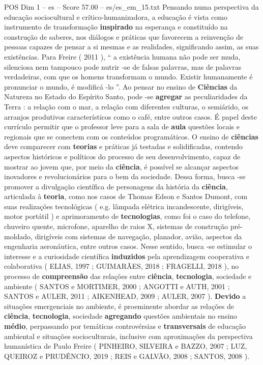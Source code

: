 \begin{textsample}{POS Dim 1 – es – Score 57.00 – es/es\_em\_15.txt}
Pensando numa perspectiva da educação sociocultural e crítico-humanizadora, a educação é vista como instrumento de transformação \textbf{inspirado} na esperança e constituído na construção de saberes, nos diálogos e práticas que favorecem a reinvenção de pessoas capazes de pensar a si mesmas e as realidades, significando assim, as suas existências.
Para Freire ( 2011 ), “ a existência humana não pode ser muda, silenciosa nem tampouco pode nutrir -se de falsas palavras, mas de palavras verdadeiras, com que os homens transformam o mundo.
Existir humanamente é pronunciar o mundo, é modificá -lo ”.
Ao pensar no ensino de \textbf{Ciências} da Natureza no Estado do Espírito Santo, pode -se \textbf{agregar} as peculiaridades da Terra : a relação com o mar, a relação com diferentes culturas, o semiárido, os arranjos produtivos característicos como o café, entre outros casos.
É papel deste currículo permitir que o professor leve para a sala de \textbf{aula} questões locais e regionais que se conectem com os conteúdos programáticos.
O ensino de \textbf{ciências} deve comparecer com \textbf{teorias} e práticas já testadas e solidificadas, contendo aspectos históricos e políticos do processo de seu desenvolvimento, capaz de mostrar ao jovem que, por meio da \textbf{ciência}, é possível se alcançar aspectos inovadores e revolucionários para o bem da sociedade.
Dessa forma, busca -se promover a divulgação científica de personagens da história da \textbf{ciência}, articulada à \textbf{teoria}, como nos casos de Thomas Edson e Santos Dumont, com suas realizações tecnológicas ( e.g. lâmpada elétrica incandescente, dirigíveis, motor portátil ) e aprimoramento de \textbf{tecnologias}, como foi o caso do telefone, chuveiro quente, microfone, aparelho de raios X, sistemas de construção pré-moldado, dirigíveis com sistemas de navegação, planador, avião, aspectos da engenharia aeronáutica, entre outros casos.
Nesse sentido, busca -se estimular o interesse e a curiosidade científica \textbf{induzidos} pela aprendizagem cooperativa e colaborativa ( ELIAS, 1997 ; GUIMARÃES, 2018 ; FRAGELLI, 2018 ), no processo de \textbf{compreensão} das relações entre \textbf{ciência}, \textbf{tecnologia}, sociedade e ambiente ( SANTOS e MORTIMER, 2000 ; ANGOTTI e AUTH, 2001 ; SANTOS e AULER, 2011 ; AIKENHEAD, 2009 ; AULER, 2007 ). \textbf{Devido} a situações emergenciais no ambiente, é proeminente abordar as relações de \textbf{ciência}, \textbf{tecnologia}, sociedade \textbf{agregando} questões ambientais no ensino \textbf{médio}, perpassando por temáticas controvérsias e \textbf{transversais} de educação ambiental e situações socioculturais, inclusive com aproximações da perspectiva humanística de Paulo Freire ( PINHEIRO, SILVEIRA e BAZZO, 2007 ; LUZ, QUEIROZ e PRUDÊNCIO, 2019 ; REIS e GALVÃO, 2008 ; SANTOS, 2008 ).

\end{textsample}
